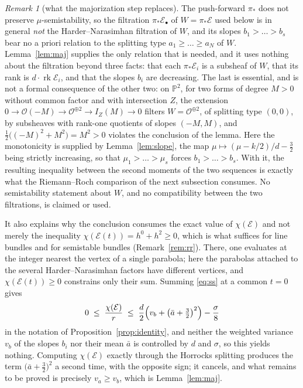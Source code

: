 \documentclass[11pt]{amsart}
\theoremstyle{remark}
\newtheorem{remark}[theorem]{Remark}
\theoremstyle{definition}
\newcommand{\PP}{\mathbb{P}}
\newcommand{\cO}{\mathcal{O}}
\newcommand{\cE}{\mathcal{E}}
\newcommand{\rk}{\operatorname{rk}}
\begin{document}
\begin{remark}[what the majorization step replaces]\label{rem:whymaj}
The push-forward $\pi_*$ does not preserve $\mu$-semistability, so the filtration $\pi_*\cE_\bullet$ of $W=\pi_*\cE$ used below is in general \emph{not} the Harder--Narasimhan filtration of $W$, and its slopes $b_1>\dots>b_s$ bear no a priori relation to the splitting type $a_1\ge\dots\ge a_N$ of $W$. Lemma~\ref{lem:maj} supplies the only relation that is needed, and it uses nothing about the filtration beyond three facts: that each $\pi_*\cE_i$ is a subsheaf of $W$, that its rank is $d\cdot\rk\cE_i$, and that the slopes $b_i$ are decreasing. The last is essential, and is not a formal consequence of the other two: on $\PP^2$, for two forms of degree $M>0$ without common factor and with intersection $Z$, the extension $0\to\cO(-M)\to\cO^{\oplus2}\to I_Z(M)\to0$ filters $W=\cO^{\oplus2}$, of splitting type $(0,0)$, by subsheaves with rank-one quotients of slopes $(-M,M)$, and $\tfrac12\bigl((-M)^2+M^2\bigr)=M^2>0$ violates the conclusion of the lemma. Here the monotonicity is supplied by Lemma~\ref{lem:slope}, the map $\mu\mapsto(\mu-k/2)/d-\tfrac32$ being strictly increasing, so that $\mu_1>\dots>\mu_s$ forces $b_1>\dots>b_s$. With it, the resulting inequality between the second moments of the two sequences is exactly what the Riemann--Roch comparison of the next subsection consumes. No semistability statement about $W$, and no compatibility between the two filtrations, is claimed or used.

It also explains why the conclusion consumes the exact value of $\chi(\cE)$ and not merely the inequality $\chi(\cE(t))=h^0+h^2\ge0$, which is what suffices for line bundles and for semistable bundles (Remark~\ref{rem:rr}). There, one evaluates at the integer nearest the vertex of a single parabola; here the parabolas attached to the several Harder--Narasimhan factors have different vertices, and $\chi(\cE(t))\ge0$ constrains only their sum. Summing \eqref{eq:ss} at a common $t=0$ gives
\[
0\;\le\;\frac{\chi(\cE)}{r}\;\le\;\frac d2\Bigl(v_b+\bigl(\bar a+\tfrac32\bigr)^2\Bigr)-\frac\sigma8
\]
in the notation of Proposition~\ref{prop:identity}, and neither the weighted variance $v_b$ of the slopes $b_i$ nor their mean $\bar a$ is controlled by $d$ and $\sigma$, so this yields nothing. Computing $\chi(\cE)$ exactly through the Horrocks splitting produces the term $\bigl(\bar a+\tfrac32\bigr)^2$ a second time, with the opposite sign; it cancels, and what remains to be proved is precisely $v_a\ge v_b$, which is Lemma~\ref{lem:maj}.
\end{remark}
\end{document}

